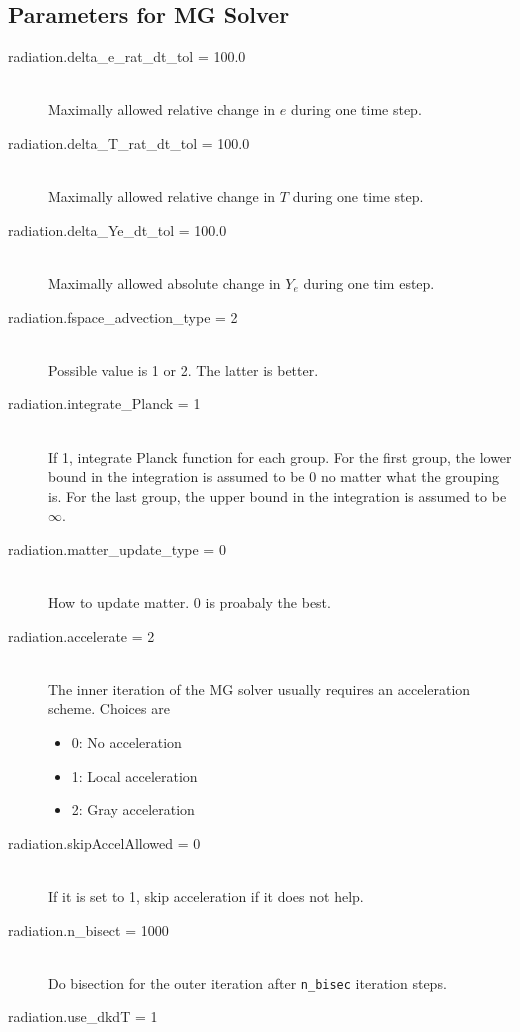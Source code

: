 \subsection{Parameters for MG Solver}
\label{sec:mgpar}

\begin{description}
\item[radiation.delta\_e\_rat\_dt\_tol = 100.0] \hfill \\
  Maximally allowed relative change in $e$ during one time step.
\item[radiation.delta\_T\_rat\_dt\_tol = 100.0] \hfill \\
  Maximally allowed relative change in $T$ during one time step.
\item[radiation.delta\_Ye\_dt\_tol = 100.0] \hfill \\
  Maximally allowed absolute change in $Y_e$ during one tim estep.
\item[radiation.fspace\_advection\_type = 2] \hfill \\
  Possible value is 1 or 2.  The latter is better.
\item[radiation.integrate\_Planck = 1] \hfill \\
  If 1, integrate Planck function for each group.  For the first
  group, the lower bound in the integration is assumed to be 0 no
  matter what the grouping is.  For the last group, the upper bound in
  the integration is assumed to be $\infty$.
\item[radiation.matter\_update\_type = 0] \hfill \\
  How to update matter.  0 is proabaly the best.
\item[radiation.accelerate = 2] \hfill \\
  The inner iteration of the MG solver usually requires an
  acceleration scheme.  Choices are
  \begin{itemize}
    \item 0: No acceleration
    \item 1: Local acceleration
    \item 2: Gray acceleration
  \end{itemize}
\item[radiation.skipAccelAllowed = 0] \hfill \\
  If it is set to 1, skip acceleration if it does not help.
\item[radiation.n\_bisect = 1000] \hfill \\
  Do bisection for the outer iteration after {\tt n\_bisec} iteration steps.
\item[radiation.use\_dkdT = 1] \hfill \\

\end{description}
